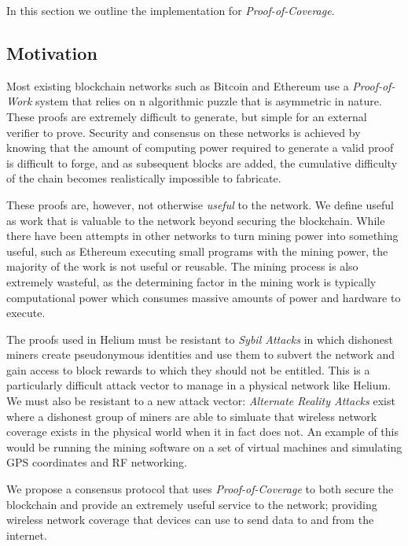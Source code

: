 \documentclass[letterpaper,11pt]{article}
\def\proofofcoverage/{\textit{Proof-of-Coverage}}
\begin{document}
In this section we outline the implementation for \proofofcoverage/.

\subsection{Motivation}

Most existing blockchain networks such as Bitcoin \cite{bitcoin} and Ethereum \cite{ethereum} use a \textit{Proof-of-Work} system that relies on n algorithmic puzzle that is asymmetric in nature. These proofs are extremely difficult to generate, but simple for an external verifier to prove. Security and consensus on these networks is achieved by knowing that the amount of computing power required to generate a valid proof is difficult to forge, and as subsequent blocks are added, the cumulative difficulty of the chain becomes realistically impossible to fabricate. \newline

These proofs are, however, not otherwise \textit{useful} to the network. We define useful as work that is valuable to the network beyond securing the blockchain. While there have been attempts in other networks to turn mining power into something useful, such as Ethereum executing small programs with the mining power, the majority of the work is not useful or reusable. The mining process is also extremely wasteful, as the determining factor in the mining work is typically computational power which consumes massive amounts of power and hardware to execute.\newline

The proofs used in Helium must be resistant to \textit{Sybil Attacks} in which dishonest miners create pseudonymous identities and use them to subvert the network and gain access to block rewards to which they should not be entitled. This is a particularly difficult attack vector to manage in a physical network like Helium. We must also be resistant to a new attack vector: \textit{Alternate Reality Attacks} exist where a dishonest group of miners are able to simluate that wireless network coverage exists in the physical world when it in fact does not. An example of this would be running the mining software on a set of virtual machines and simulating GPS coordinates and RF networking.\newline

We propose a consensus protocol that uses \proofofcoverage/ to both secure the blockchain and provide an extremely useful service to the network; providing wireless network coverage that devices can use to send data to and from the internet. 
\end{document}
